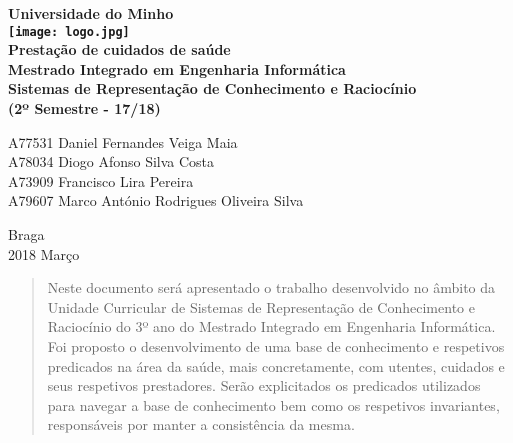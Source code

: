 \documentclass[a4paper]{article}
\begin{document}
\vfill
\begin{center}
    \Huge\bfseries
    Universidade do Minho \\
    \vspace{10mm}
    \texttt{[image: logo.jpg]}\\[0.5cm]
    \vspace{30mm}
    \LARGE\bfseries
           Prestação de cuidados de saúde \\
    \vspace{30mm}
    \large\bfseries
    Mestrado Integrado em Engenharia Informática \\
    \vspace{20mm}
    Sistemas de Representação de Conhecimento e Raciocínio \\
    (2º Semestre - 17/18)
\end{center}

\vfill

\begin{flushleft}
A77531 \hspace{3mm} Daniel Fernandes Veiga Maia \\
A78034 \hspace{3mm} Diogo Afonso Silva Costa \\
A73909 \hspace{3mm} Francisco Lira Pereira \\
A79607 \hspace{3mm} Marco António Rodrigues Oliveira Silva \\
\end{flushleft}

\vspace{10mm}

\begin{flushright}
Braga \\
2018 Março
\end{flushright}

\thispagestyle{empty}

\newpage

\begin{abstract}

\hspace{3mm} Neste documento será apresentado o trabalho desenvolvido no âmbito da Unidade Curricular de Sistemas de Representação de Conhecimento e Raciocínio do 3º ano do Mestrado Integrado em Engenharia Informática. Foi proposto o desenvolvimento de uma base de conhecimento e respetivos predicados na área da saúde, mais concretamente, com utentes, cuidados e seus respetivos prestadores. Serão explicitados os predicados utilizados para navegar a base de conhecimento bem como os respetivos invariantes, responsáveis por manter a consistência da mesma.


\end{abstract}
\end{document}
